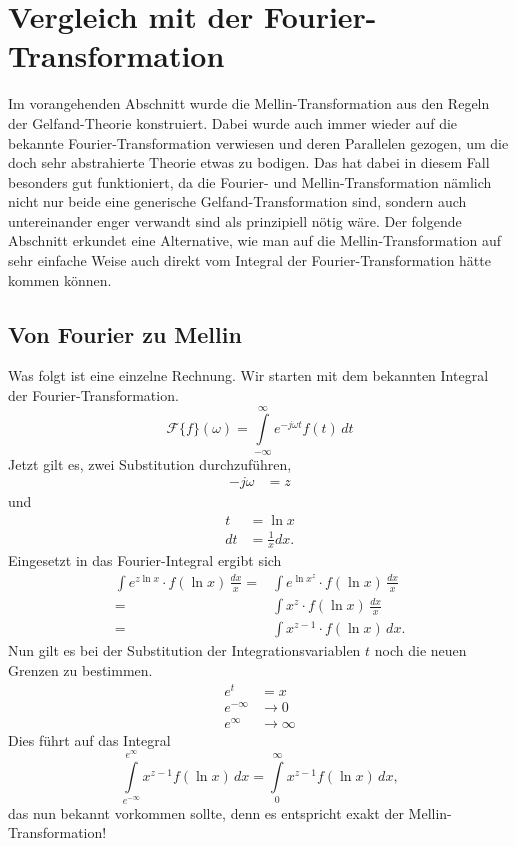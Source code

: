 %
%
%
%
\section{Vergleich mit der Fourier-Transformation
\label{mellin:section:teil3}}
Im vorangehenden Abschnitt wurde die Mellin-Transformation aus den 
Regeln der Gelfand-Theorie konstruiert. 
Dabei wurde auch immer wieder auf die bekannte Fourier-Transformation 
verwiesen und deren Parallelen gezogen, um die doch sehr abstrahierte 
Theorie etwas zu bodigen.
Das hat dabei in diesem Fall besonders gut funktioniert, da die Fourier- 
und Mellin-Transformation nämlich nicht nur beide eine generische 
Gelfand-Transformation sind, sondern auch untereinander enger verwandt 
sind als prinzipiell nötig wäre.
Der folgende Abschnitt erkundet eine Alternative, wie man auf die 
Mellin-Transformation auf sehr einfache Weise auch direkt vom Integral 
der Fourier-Transformation hätte kommen können.

\subsection{Von Fourier zu Mellin
\label{mellin:subsection:foumel}}
Was folgt ist eine einzelne Rechnung.
Wir starten mit dem bekannten Integral der Fourier-Transformation.
\begin{equation}
    \mathcal{F}\{f \}(\omega) 
    = \int\limits_{-\infty}^{\infty} e^{-j\omega{}t} f(t) \,{d}t
    \label{mellin:fourier}
\end{equation}
Jetzt gilt es, zwei Substitution durchzuführen,
\begin{align*}
    -j\omega &= z
\end{align*}
und
\begin{align*}
    t &= \ln x \\
    {d}t &= \frac{1}{x} {d}x
    .
\end{align*}
Eingesetzt in das Fourier-Integral ergibt sich
\begin{align*}
    \int e^{z \ln x} \cdot f(\ln x) \,\frac{{d}x}{x}
    = &\int e^{\ln x^z} \cdot f(\ln x) \,\frac{{d}x}{x} \\
    = &\int x^{z} \cdot f(\ln x) \,\frac{{d}x}{x} \\
    = &\int x^{z-1} \cdot f(\ln x) \,{d}x
    .
\end{align*}
Nun gilt es bei der Substitution der Integrationsvariablen $t$ noch die 
neuen Grenzen zu bestimmen.
\begin{align*}
    e^{t} &= x \\
    e^{-\infty} &\rightarrow 0 \\
    e^{\infty} &\rightarrow \infty 
\end{align*}
Dies führt auf das Integral
\[
    \int\limits_{e^{-\infty}}^{e^{\infty}} x^{z-1} f(\ln x) \,{d}x 
    = \int\limits_{0}^{\infty} x^{z-1} f(\ln x) \,{d}x
    ,
\]
das nun bekannt vorkommen sollte, denn es entspricht exakt der 
Mellin-Transformation!
\medskip

